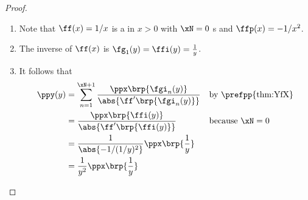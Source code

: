\begin{proof}
\begin{enumerate}
  \item \label{item:Yf1X_ffp}
        Note that $\ff(x)=1/x$ is a  in $x>0$
        with $\xN=0$ s
        and $\ffp(x)=-1/x^2$.
  \item \label{item:Yf1X_ffi}
        The inverse of $\ff(x)$ is $\fg_1(y)=\ffi(y)=\frac{1}{y}$.
  \item It follows that
    \begin{align*}
      \ppy(y)
        &= \sum_{n=1}^{\xN+1} \frac{\ppx\brp{\fgi_n(y)}}{\abs{\ff'\brp{\fgi_n(y)}}}
        && \text{by \prefpp{thm:YfX}}
      \\&= \frac{\ppx\brp{\ffi(y)}}{\abs{\ff'\brp{\ffi(y)}}}
        && \text{because $\xN=0$}
      \\&= \frac{1}{\abs{-1/(1/y)^2}}\ppx\brp{\frac{1}{y}}
      \\&= \frac{1}{y^2}\ppx\brp{\frac{1}{y}}
    \end{align*}
\end{enumerate}
%

\end{proof}
